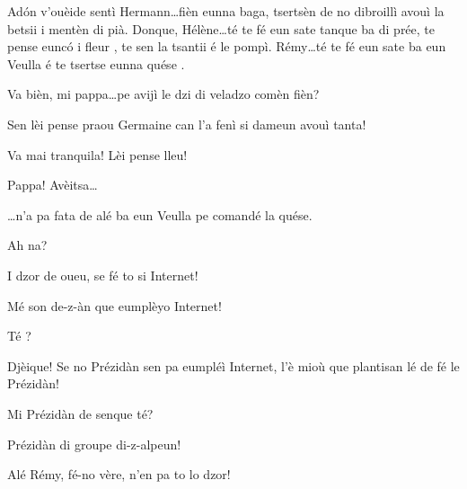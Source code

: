 \begin{drama}

\Cesarspeaks{} Ad\'on v'ouèide sentì Hermann\ldots fièn eunna baga, tsertsèn de no dibroillì avouì la betsii i mentèn di pià. Donque, Hélène\ldots té te fé eun sate tanque ba di prée, te pense eunc\'o i fleur \fiori, te sen la tsantii é le pompì. Rémy\ldots té te fé eun sate ba eun Veulla é te tsertse eunna quése \cassa.


\Helenespeaks Va bièn, mi pappa\ldots pe avijì le dzi di veladzo comèn fièn?

\Cesarspeaks   Sen lèi pense praou Germaine  can l'a fenì si dameun avouì tanta!

\Battistaspeaks{} Va mai tranquila! Lèi pense lleu!




\Remyspeaks  Pappa! Avèitsa\ldots


\Remyspeaks \ldots n’a pa fata de alé ba 
eun Veulla pe comandé la quése.

\Cesarspeaks Ah na?

\Remyspeaks I dzor de oueu, se fé to si Internet! 

\Battistaspeaks{}  Mé son de-z-àn que eumplèyo Internet!

\Cesarspeaks{} Té \contraria ?

\Battistaspeaks Djèique! Se no Prézidàn sen pa eumpléì Internet, l’è mioù que plantisan lé de fé le Prézidàn!

\Hermannspeaks Mi Prézidàn de senque té?

\Battistaspeaks  Prézidàn di groupe di-z-alpeun!


\Cesarspeaks Alé Rémy, fé-no vère, n'en pa to lo dzor! 



\end{drama}
